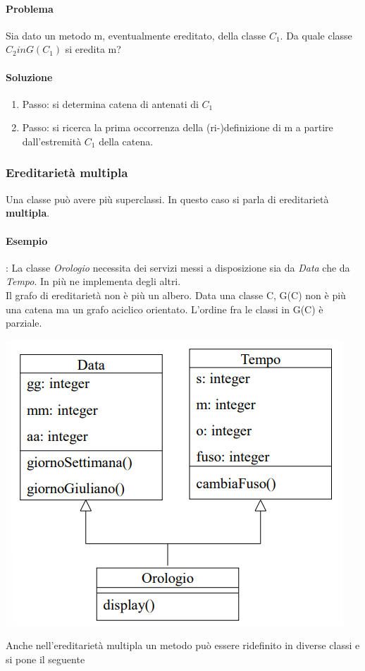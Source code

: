\documentclass{article}
\begin{document}
	\paragraph*{Problema} Sia dato un metodo m, eventualmente ereditato, della classe $C_1$. Da quale classe $C_2 in G(C_1)$ si eredita m?
	\paragraph*{Soluzione}
	\begin{enumerate}
		\item Passo: si determina catena di antenati di $C_1$
		\item Passo: si ricerca la prima occorrenza della (ri-)definizione di m a partire dall'estremità $C_1$ della catena.
	\end{enumerate}

	\subsubsection{Ereditarietà multipla}
	Una classe può avere più superclassi. In questo caso si parla di ereditarietà \textbf{multipla}.
	\paragraph*{Esempio}: La classe \textit{Orologio} necessita dei servizi messi a disposizione sia da \textit{Data} che da \textit{Tempo}. In più ne implementa degli altri.
	\vspace{\baselineskip} \\
	Il grafo di ereditarietà non è più un albero. Data una classe C, G(C) non è più una catena ma un grafo aciclico orientato. L'ordine fra le classi in G(C) è parziale.
	\begin{center}
		\includegraphics[scale=0.5]{assets/ereditarieta_multipla.png}
	\end{center}
	Anche nell'ereditarietà multipla un metodo può essere ridefinito in diverse classi e si pone il seguente
\end{document}
